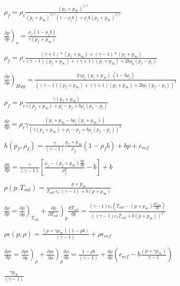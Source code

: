 \documentclass{article}
\begin{document}
$ \rho_f = \rho_i \frac{(p_f + p_{\infty})^{1/\gamma}}{(p_i + p_{\infty})^{1/\gamma} (1-\rho_i b) + \rho_i b (p_f + p_{\infty})^{1/\gamma}} $
\pagebreak

$ \left. \frac{\partial \rho}{\partial p} \right)_s = \frac{\rho_f (1-\rho_f b)}{\gamma (p_f+p_{\infty})} $
\pagebreak

$ \rho_f =\rho_i\frac{ (\gamma + 1)*(p_f+p_{\infty}) + (\gamma - 1)*(p_i+p_{\infty})}{(\gamma - 1)(p_f+p_{\infty}) +(\gamma + 1)(p_i+p_{\infty}) + 2 b \rho_0 (p_f-p_i)} $
\pagebreak

$ \left. \frac{\partial \rho}{\partial p} \right)_{Hug} = \frac{4\gamma \rho_i \ (p_i+p_{\infty}) \ (1- b\rho_i)}{ \left( (\gamma - 1)(p_f+p_{\infty}) +(\gamma + 1)(p_i+p_{\infty}) +2b\rho_i (p_f-p_i)\right) ^2} $
\pagebreak

$ \rho_f = \rho_i \frac{\gamma (p_f+p_{\infty})}{\gamma (p_f+p_{\infty}) + p_i - p_f + b \rho_i (p_f -p_i)} $
\pagebreak

$ \frac{d\rho}{dp} = \rho_i \gamma \frac{\left(p_i + p_{\infty}-b \rho_i (p_i + p_{\infty})\right)}{\left(\gamma (p_f+p_{\infty}) + p_i - p_f+b \rho_i (p_f - p_i)\right)^2} $
\pagebreak

$ h(p_f,{\rho_f})= \frac{\gamma}{(\gamma-1)}\frac{p_f+p_{\infty}}{\rho_f} (1-\rho_f b) + b p + e_{ref} $
\pagebreak

$ \frac{dh}{dp}=\frac{\gamma}{(\gamma-1)}\left[\frac{ \rho_f - (p_f+p_{\infty}) \frac{d\rho}{dp} }{\rho_f^2}-b\right] +b $
\pagebreak

$ \rho(p, T_{sat}) = \frac{p+p_{\infty}}{T_{sat} \ c_v \ (\gamma-1) + b(p+p_{\infty})} $
\pagebreak

$ \frac{d \rho}{d p} = \left. \frac{\partial \rho}{\partial p} \right)_{T_{sat}} + \left. \frac{\partial \rho}{\partial T_{sat} } \right)_p \frac{d T_{sat}}{d p} =\frac{(\gamma-1)c_v\left(T_{sat} - (p+p_{\infty})\frac{d T_{sat}}{d p}\right) }{\left((\gamma-1)c_vT_{sat} + b(p+p_{\infty}) \right)^2 } $
\pagebreak

$ \rho\epsilon(p, \rho) = \frac{(p+\gamma p_{\infty})(1-\rho b)}{(\gamma-1)} +\rho\epsilon_{ref} $
\pagebreak

$ \frac{d \rho\epsilon}{d p} =\left. \frac{\partial \rho\epsilon}{\partial p} \right)_{\rho} + \left. \frac{\partial \rho\epsilon}{\partial\rho } \right)_p \frac{d\rho}{dp} = \frac{1-\rho b}{(\gamma-1)} +\frac{d \rho}{d p}\left(\epsilon_{ref}-b\frac{(p+\gamma p_{\infty})}{\gamma-1}\right) $
\pagebreak

$ \frac{\gamma p_{\infty}}{(\gamma-1)} $
\pagebreak
\end{document}
